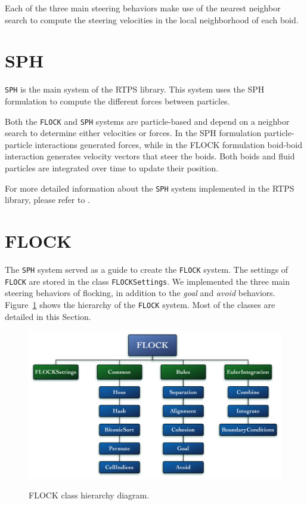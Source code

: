 Each of the three main steering behaviors make use of the nearest neighbor search to compute the steering velocities in the local neighborhood of each boid.

\section{SPH}\label{sphsection}
\texttt{SPH} is the main system of the RTPS library. This system uses the SPH formulation to compute the different forces between particles.

Both the \texttt{FLOCK} and \texttt{SPH} systems are particle-based and depend on a neighbor search to determine either velocities or forces. In the SPH formulation particle-particle interactions generated forces, while in the FLOCK formulation boid-boid interaction generates velocity vectors that steer the boids. Both boids and fluid particles are integrated over time to update their position.

For more detailed information about the \texttt{SPH} system implemented in the RTPS library, please refer to \cite{ianThesis}.

\section{FLOCK}\label{flocksection}
The \texttt{SPH} system served as a guide to create the \texttt{FLOCK} system. The settings of \texttt{FLOCK} are stored in the class \texttt{FLOCKSettings}. We implemented the three main steering behaviors of flocking, in addition to the \textit{goal} and \textit{avoid} behaviors. Figure~\ref{flockdiagram} shows the hierarchy of the \texttt{FLOCK} system. Most of the classes are detailed in this Section. 

\begin{figure}[htbp]
\begin{center}
\includegraphics[scale=0.42]{figures/FLOCKdiagramMyrna.pdf}
\caption{FLOCK class hierarchy diagram.} 
\label{flockdiagram}
\end{center}
\end{figure}


